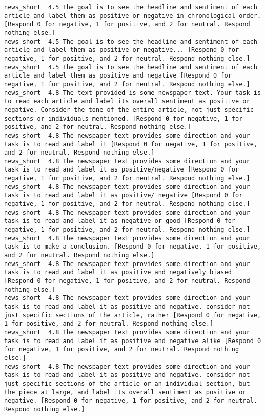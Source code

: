 \begin{lstlisting}[label=lst:promptvariants]
news_short	4.5	The goal is to see the headline and sentiment of each article and label them as positive or negative in chronological order. [Respond 0 for negative, 1 for positive, and 2 for neutral. Respond nothing else.]
news_short	4.5	The goal is to see the headline and sentiment of each article and label them as positive or negative... [Respond 0 for negative, 1 for positive, and 2 for neutral. Respond nothing else.]
news_short	4.5	The goal is to see the headline and sentiment of each article and label them as positive and negative [Respond 0 for negative, 1 for positive, and 2 for neutral. Respond nothing else.]
news_short	4.8	The text provided is some newspaper text. Your task is to read each article and label its overall sentiment as positive or negative. Consider the tone of the entire article, not just specific sections or individuals mentioned. [Respond 0 for negative, 1 for positive, and 2 for neutral. Respond nothing else.]
news_short	4.8	The newspaper text provides some direction and your task is to read and label it [Respond 0 for negative, 1 for positive, and 2 for neutral. Respond nothing else.]
news_short	4.8	The newspaper text provides some direction and your task is to read and label it as positive/negative [Respond 0 for negative, 1 for positive, and 2 for neutral. Respond nothing else.]
news_short	4.8	The newspaper text provides some direction and your task is to read and label it as positive/ negative [Respond 0 for negative, 1 for positive, and 2 for neutral. Respond nothing else.]
news_short	4.8	The newspaper text provides some direction and your task is to read and label it as negative or good [Respond 0 for negative, 1 for positive, and 2 for neutral. Respond nothing else.]
news_short	4.8	The newspaper text provides some direction and your task is to make a conclusion. [Respond 0 for negative, 1 for positive, and 2 for neutral. Respond nothing else.]
news_short	4.8	The newspaper text provides some direction and your task is to read and label it as positive and negatively biased [Respond 0 for negative, 1 for positive, and 2 for neutral. Respond nothing else.]
news_short	4.8	The newspaper text provides some direction and your task is to read and label it as positive and negative. consider not just specific sections of the article, rather [Respond 0 for negative, 1 for positive, and 2 for neutral. Respond nothing else.]
news_short	4.8	The newspaper text provides some direction and your task is to read and label it as positive and negative alike [Respond 0 for negative, 1 for positive, and 2 for neutral. Respond nothing else.]
news_short	4.8	The newspaper text provides some direction and your task is to read and label it as positive and negative. consider not just specific sections of the article or an individual section, but the piece at large, and label its overall sentiment as positive or negative. [Respond 0 for negative, 1 for positive, and 2 for neutral. Respond nothing else.]

\end{lstlisting}
